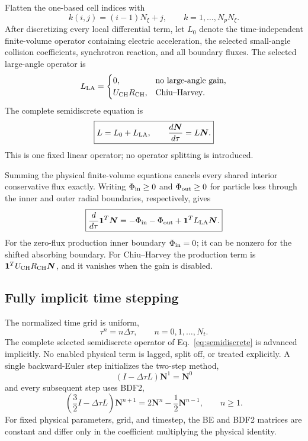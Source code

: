 \documentclass[11pt]{article}
\begin{document}
Flatten the one-based cell indices with
\begin{equation}
 k(i,j)=(i-1)N_\xi+j,
 \qquad k=1,\ldots,N_pN_\xi.
 \label{eq:flattening}
\end{equation}
After discretizing every local differential term, let $L_0$ denote the time-independent
finite-volume operator containing electric acceleration, the selected small-angle
collision coefficients, synchrotron reaction, and all boundary fluxes.  The selected
large-angle operator is
\begin{equation}
 L_{\rm LA}=\begin{cases}
 0, & \text{no large-angle gain},\\
 U_{\rm CH}R_{\rm CH}, & \text{Chiu--Harvey}.
 \end{cases}
 \label{eq:large_angle_discrete_choices}
\end{equation}
The complete semidiscrete equation is
\begin{equation}
 \boxed{
 L=L_0+L_{\rm LA},\qquad
 \frac{d\bm N}{d\tau}=L\bm N.
 }
 \label{eq:semidiscrete}
\end{equation}
This is one fixed linear operator; no operator splitting is introduced.

Summing the physical finite-volume equations cancels every shared interior conservative
flux exactly.  Writing $\Phi_{\rm in}\ge0$ and $\Phi_{\rm out}\ge0$ for particle loss
through the inner and outer radial boundaries, respectively, gives
\begin{equation}
 \boxed{
 \frac{d}{d\tau}\bm 1^T\bm N
 =-\Phi_{\rm in}-\Phi_{\rm out}+\bm 1^TL_{\rm LA}\bm N.
 }
 \label{eq:discrete_particle_balance}
\end{equation}
For the zero-flux production inner boundary $\Phi_{\rm in}=0$; it can be nonzero for the
shifted absorbing boundary.  For Chiu--Harvey the production term is
$\bm1^TU_{\rm CH}R_{\rm CH}\bm N$, and it vanishes when the gain is disabled.

\subsection{Fully implicit time stepping}

The normalized time grid is uniform,
\begin{equation}
 \tau^n=n\Delta\tau,\qquad n=0,1,\ldots,N_t.
 \label{eq:uniform_time_grid}
\end{equation}
The complete selected semidiscrete operator of Eq.~\eqref{eq:semidiscrete} is advanced
implicitly.  No enabled physical term is lagged, split off, or treated explicitly.
A single backward-Euler step initializes the two-step method,
\begin{equation}
 \boxed{\left(I-\Delta\tau L\right)\bm N^1=\bm N^0}
 \label{eq:be}
\end{equation}
and every subsequent step uses BDF2,
\begin{equation}
 \boxed{
 \left(\frac{3}{2}I-\Delta\tau L\right)\bm N^{n+1}
 =2\bm N^n-\frac{1}{2}\bm N^{n-1},\qquad n\ge1.
 }
 \label{eq:bdf2}
\end{equation}
For fixed physical parameters, grid, and timestep, the BE and BDF2 matrices are constant
and differ only in the coefficient multiplying the physical identity.
\end{document}
